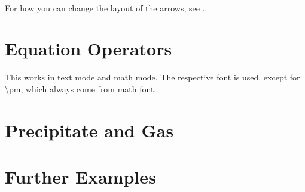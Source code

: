 \documentclass[a4paper,notitlepage,parskip=half]{scrreprt}
\newcommand\macro[1]{{\ttfamily\textbackslash#1}}
\begin{document}
\begin{SideBySideExample}[xrightmargin=3cm]
  \\%
  \sffamily\bfseries
\end{SideBySideExample}

For how you can change the layout of the arrows, see .


\section{Equation Operators}

\begin{SideBySideExample}[xrightmargin=3cm]
\end{SideBySideExample}

\begin{SideBySideExample}[xrightmargin=3cm]
\end{SideBySideExample}

\begin{SideBySideExample}[xrightmargin=3cm]
\end{SideBySideExample}

\begin{SideBySideExample}[xrightmargin=3cm]
\end{SideBySideExample}

This works in text mode and math mode. The respective font is used, except for \macro{pm}, which always come from math font.


\section{Precipitate and Gas}

\begin{SideBySideExample}[xrightmargin=6cm]
\end{SideBySideExample}

\begin{SideBySideExample}[xrightmargin=6cm]
\end{SideBySideExample}


\section{Further Examples}

\begin{Example}[xrightmargin=15cm]
\end{Example}
\end{document}
